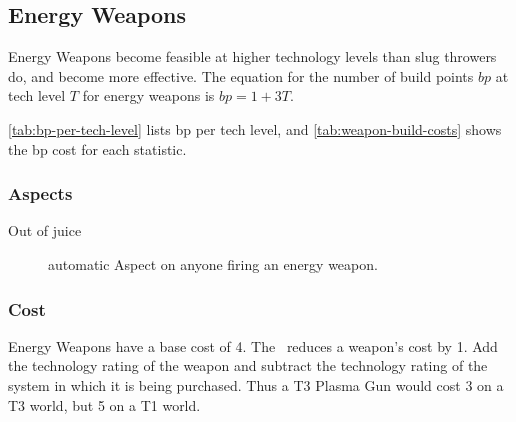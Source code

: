 \subsection{Energy Weapons}
\label{sec:energy-weapons}

Energy Weapons become feasible at higher technology levels than slug
throwers do, and become more effective. The equation for the number of build points $bp$ at tech level $T$ for
energy weapons is $bp = 1 + 3T$.

\autoref{tab:bp-per-tech-level} lists bp per tech level, and \autoref{tab:weapon-build-costs} shows the bp cost for each statistic.

% 


\subsubsection{Aspects}
\begin{description}
\item[Out of juice]
automatic Aspect on anyone firing an energy weapon.
\end{description}

\subsubsection{Cost}

Energy Weapons have a base cost of 4. The  \Stunt\ reduces a weapon's cost by 1. Add the technology rating of the weapon and subtract the technology rating of the system in which it is being purchased. Thus a T3 Plasma Gun would cost 3 on a T3 world, but 5 on a T1 world.

